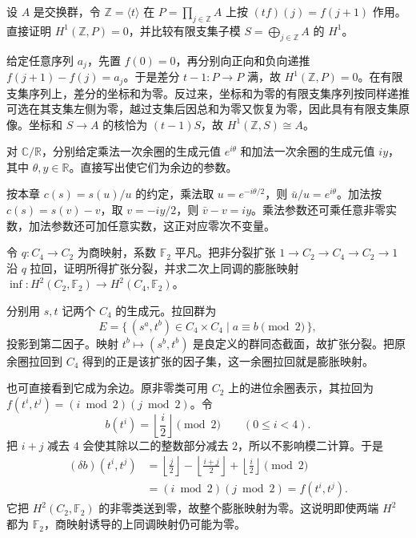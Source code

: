 \begin{exercise}\label{b4:ex:11-sequence-difference}
	设 \(A\) 是交换群，令 \(\mathbb Z=\langle t\rangle\) 在 \(P=\prod_{j\in\mathbb Z}A\) 上按 \((tf)(j)=f(j+1)\) 作用。直接证明 \(H^1(\mathbb Z,P)=0\)，并比较有限支集子模 \(S=\bigoplus_{j\in\mathbb Z}A\) 的 \(H^1\)。
\end{exercise}
\begin{solution}
	给定任意序列 \(a_j\)，先置 \(f(0)=0\)，再分别向正向和负向递推 \(f(j+1)-f(j)=a_j\)。于是差分 \(t-1:P\to P\) 满，故 \(H^1(\mathbb Z,P)=0\)。在有限支集序列上，差分的坐标和为零。反过来，坐标和为零的有限支集序列按同样递推可选在其支集左侧为零，越过支集后因总和为零又恢复为零，因此具有有限支集原像。坐标和 \(S\to A\) 的核恰为 \((t-1)S\)，故 \(H^1(\mathbb Z,S)\cong A\)。
\end{solution}

\begin{exercise}\label{b4:ex:11-hilbert90-concrete}
	对 \(\mathbb C/\mathbb R\)，分别给定乘法一次余圈的生成元值 \(e^{i\theta}\) 和加法一次余圈的生成元值 \(iy\)，其中 \(\theta,y\in\mathbb R\)。直接写出使它们为余边的参数。
\end{exercise}
\begin{solution}
	按本章 \(c(s)=s(u)/u\) 的约定，乘法取 \(u=e^{-i\theta/2}\)，则 \(\bar u/u=e^{i\theta}\)。加法按 \(c(s)=s(v)-v\)，取 \(v=-iy/2\)，则 \(\bar v-v=iy\)。乘法参数还可乘任意非零实数，加法参数还可加任意实数，这正对应零次不变量。
\end{solution}

\begin{exercise}\label{b4:ex:11-inflation-extension}
	令 \(q:C_4\to C_2\) 为商映射，系数 \(\mathbb F_2\) 平凡。把非分裂扩张 \(1\to C_2\to C_4\to C_2\to1\) 沿 \(q\) 拉回，证明所得扩张分裂，并求二次上同调的膨胀映射 \(\operatorname{inf}:H^2(C_2,\mathbb F_2)\to H^2(C_4,\mathbb F_2)\)。
\end{exercise}
\begin{solution}
	分别用 \(s,t\) 记两个 \(C_4\) 的生成元。拉回群为
	\[
		E=\{\, (s^a,t^b)\in C_4\times C_4\mid a\equiv b\pmod2\,\},
	\]
	投影到第二因子。映射 \(t^b\mapsto(s^b,t^b)\) 是良定义的群同态截面，故扩张分裂。把原余圈拉回到 \(C_4\) 得到的正是该扩张的因子集，这一余圈拉回就是膨胀映射。

	也可直接看到它成为余边。原非零类可用 \(C_2\) 上的进位余圈表示，其拉回为 \(f(t^i,t^j)=(i\bmod2)(j\bmod2)\)。令
	\[
		b(t^i)=\left\lfloor\frac i2\right\rfloor\pmod2 \qquad(0\le i<4).
	\]
	把 \(i+j\) 减去 \(4\) 会使其除以二的整数部分减去 \(2\)，所以不影响模二计算。于是
	\[
		\begin{aligned}
			(\delta b)(t^i,t^j) &=\left\lfloor\frac j2\right\rfloor -\left\lfloor\frac{i+j}{2}\right\rfloor +\left\lfloor\frac i2\right\rfloor\pmod2\\
			&=(i\bmod2)(j\bmod2)=f(t^i,t^j).
		\end{aligned}
	\]
	它把 \(H^2(C_2,\mathbb F_2)\) 的非零类送到零，故整个膨胀映射为零。这说明即使两端 \(H^2\) 都为 \(\mathbb F_2\)，商映射诱导的上同调映射仍可能为零。
\end{solution}

